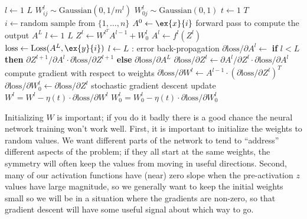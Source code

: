 \begin{codebox}
  \li     \For $l \gets 1$ \To $L$
        \Do
  \li        $W_{ij}^l \sim \text{Gaussian}(0, 1/m^l)$
  \li        $W_{0j}^l \sim \text{Gaussian}(0, 1)$
            \End
  \li \For $t \gets 1$ \To $T$
  \li   \Do
          $i \gets \text{random sample from } \{1,\ldots,n\}$
  \li     $A^0 \gets \ex{x}{i}$
  \li     \Comment forward pass to compute the output $A^L$
  \li     \For $l \gets 1$ \To $L$
  \li       \Do
              $Z^l \gets W^{l^T}A^{l-1} + W_0^l$
  \li         $A^l \gets f^l(Z^l)$
            \End
  \li     $\text{loss} \gets \text{Loss}(A^L, \ex{y}{i})$
  \li     \For $l \gets L$ :
         \Do
  \li       \Comment error back-propagation
  \li       $\partial \text{loss}/\partial A^l \gets$ 	%
            {\bf if} $l < L$ 
            {\bf then}
                $\partial Z^{l+1}/\partial A^l \cdot \partial \text{loss}/\partial Z^{l+1} $   
            {\bf else}
                $ \partial \text{loss}/\partial A^L$
  \li       $\partial \text{loss}/\partial Z^l \gets \partial
  A^l/\partial Z^l  \cdot \partial
  \text{loss}/\partial A^l$
  \li       \Comment compute gradient with respect to weights
  \li       $\partial \text{loss}/\partial W^l  \gets        A^{l-1}      \cdot    \left( \partial \text{loss}/\partial Z^l  \right)^T $
  \li       $\partial \text{loss}/\partial W_0^l \gets       \partial \text{loss}/\partial Z^l $
  \li       \Comment stochastic gradient descent update
  \li       $W^l = W^l - \eta(t)\cdot \partial \text{loss}/\partial W^l$
  \li       $W^l_0 = W_0^l - \eta(t)\cdot \partial \text{loss}/\partial W_0^l$
        \End
\end{codebox}

Initializing $W$ is important;  if you do it badly there is a good
chance the neural network training won't work well.  First, it is
important to initialize the weights to random values.  We want
different parts of the network to tend to ``address'' different
aspects of the problem; if they all start at the same weights, the
symmetry will often keep the values from moving in useful directions.
Second, many of our activation functions have (near) zero slope when
the pre-activation $z$ values have large magnitude, so we generally
want to keep the initial weights small so we will be in a situation
where the gradients are non-zero, so that gradient descent will have
some useful signal about which way to go.  


